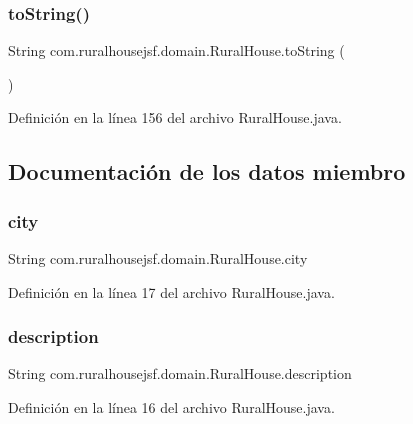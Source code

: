 \subsubsection{\texorpdfstring{toString()}{toString()}}
{\footnotesize\ttfamily String com.\+ruralhousejsf.\+domain.\+Rural\+House.\+to\+String (\begin{DoxyParamCaption}{ }\end{DoxyParamCaption})}



Definición en la línea 156 del archivo Rural\+House.\+java.



\subsection{Documentación de los datos miembro}
\mbox{\label{a00188_a495797ff9bd294c83563790e36ec2245}} 
\subsubsection{\texorpdfstring{city}{city}}
{\footnotesize\ttfamily String com.\+ruralhousejsf.\+domain.\+Rural\+House.\+city\hspace{0.3cm}{\ttfamily [private]}}



Definición en la línea 17 del archivo Rural\+House.\+java.

\mbox{\label{a00188_a3cd460d3df936008a7c7580e87680fd4}} 
\subsubsection{\texorpdfstring{description}{description}}
{\footnotesize\ttfamily String com.\+ruralhousejsf.\+domain.\+Rural\+House.\+description\hspace{0.3cm}{\ttfamily [private]}}



Definición en la línea 16 del archivo Rural\+House.\+java.

